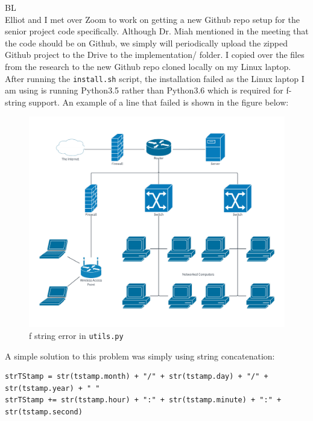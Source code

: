 \documentclass[fontsize=11pt, %
                             paper=letter, %
                             openany, %
                             captions=tableheading,
                             index=totoc,
                             hyperref]{labbook}
\begin{document}
\begin{addmargin}[0cm]{0cm}


BL\\
Elliot and I met over Zoom to work on getting a new Github repo setup for the senior project code specifically. Although Dr. Miah mentioned in the meeting that the code should be on Github, we simply will periodically upload the zipped Github project to the Drive to the implementation/ folder. I copied over the files from the research to the new Github repo cloned locally on my Linux laptop. After running the \texttt{install.sh} script, the installation failed as the Linux laptop I am using is running Python3.5 rather than Python3.6 which is required for f-string support. An example of a line that failed is shown in the figure below:
\begin{figure}[H]
\centering
\includegraphics[scale=0.6]{figs/img/installSyntaxError}
\caption{f string error in \texttt{utils.py}}
\end{figure}
A simple solution to this problem was simply using string concatenation:
\begin{Verbatim}
strTStamp = str(tstamp.month) + "/" + str(tstamp.day) + "/" + str(tstamp.year) + " "
strTStamp += str(tstamp.hour) + ":" + str(tstamp.minute) + ":" + str(tstamp.second)
\end{Verbatim}

\end{addmargin}
\end{document}
